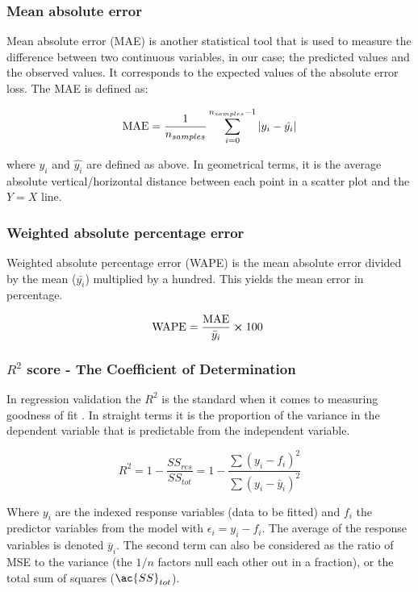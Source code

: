 \subsubsection{Mean absolute error}
Mean absolute error (\ac{MAE}) is another statistical tool that is used to measure the difference between two continuous variables, in our case; the predicted values and the observed values. It corresponds to the expected values of the absolute error loss. The MAE is defined as:

\begin{align}\label{eq:MAE}
\text{MAE} = \frac{1}{n_{samples}}\sum^{n_{samples}-1}_{i=0}\abs{y_i - \hat{y_i}}
\end{align}

where $y_i$ and $\hat{y_i}$ are defined as above. In geometrical terms, it is the average absolute vertical/horizontal distance between each point in a scatter plot and the $Y=X$ line. 

\subsubsection{Weighted absolute percentage error}

Weighted absolute percentage error (\ac{WAPE}) is the mean absolute error divided by the mean ($\bar{y_i}$) multiplied by a hundred. This yields the mean error in percentage. 

\begin{align}\label{eq:WAPE}
\text{WAPE} = \frac{\text{MAE}}{\bar{y}_{i}} \cross 100 
\end{align}
 


\subsubsection{$R^2$ score - The Coefficient of Determination}

	In regression validation the $R^2$ is the standard when it comes to measuring goodness of fit \cite{james2013introduction}. In straight terms it is the proportion of the variance in the dependent variable that is predictable from the independent variable.

\begin{equation}\label{eq: R squared}
	R^2 =1 - \frac{SS_{res}}{SS_{tot}} =  1 - \frac{ \sum(y_i-f_i)^2 }{ \sum(y_i-\bar{y}_i)^2 }
\end{equation}

	Where $y_i$ are the indexed response variables (data  to be fitted) and $f_i$ the predictor variables from the model with $\epsilon_i = y_i - f_i$. The average of the response variables is denoted $\bar{y}_i$. The second term can also be considered as the ratio of MSE to the variance (the $1/n$ factors null each other out in a fraction), or the total sum of squares ($\ac{SS}_{tot}$). 
	
